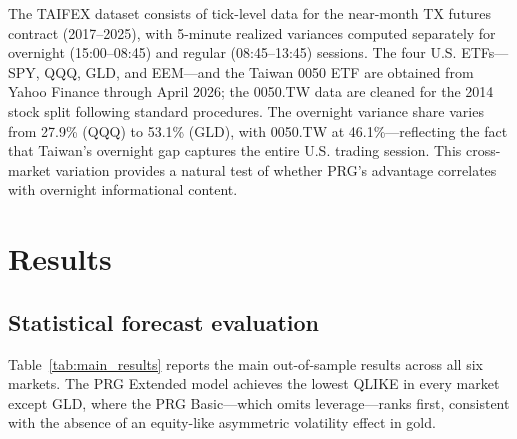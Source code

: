 \documentclass[11pt,a4paper]{article}
\begin{document}
The TAIFEX dataset consists of tick-level data for the near-month TX futures contract (2017--2025), with 5-minute realized variances computed separately for overnight (15:00--08:45) and regular (08:45--13:45) sessions. The four U.S. ETFs---SPY, QQQ, GLD, and EEM---and the Taiwan 0050 ETF are obtained from Yahoo Finance through April 2026; the 0050.TW data are cleaned for the 2014 stock split following standard procedures. The overnight variance share varies from 27.9\% (QQQ) to 53.1\% (GLD), with 0050.TW at 46.1\%---reflecting the fact that Taiwan's overnight gap captures the entire U.S. trading session. This cross-market variation provides a natural test of whether PRG's advantage correlates with overnight informational content.


\section{Results}

\subsection{Statistical forecast evaluation}

Table~\ref{tab:main_results} reports the main out-of-sample results across all six markets. The PRG Extended model achieves the lowest QLIKE in every market except GLD, where the PRG Basic---which omits leverage---ranks first, consistent with the absence of an equity-like asymmetric volatility effect in gold.
\end{document}
